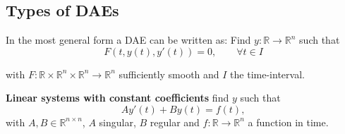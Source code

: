 	\subsection{Types of DAEs}
	\begin{frame}
		\vfill
		In the most general form a DAE can be written as:
		Find $y:\mathbb{R} \to \mathbb{R}^n$ such that
		\begin{equation}
			\label{Abstract_DAE}
			F(t, y(t), y'(t)) = 0, \qquad \forall t \in I
		\end{equation}
		
		with $F:\mathbb{R} \times \mathbb{R}^n \times \mathbb{R}^n \to \mathbb{R}^n$ sufficiently smooth and $I$ the time-interval.
		
		\textbf{Linear systems with constant coefficients} \newline
		find $y$ such that
		\begin{equation}
			\label{DAE-const-coeff}
			A y'(t) + B y(t) = f(t) ,
		\end{equation}
		with $A,B \in \mathbb{R}^{n \times n}$, $A$ singular, $B$ regular and $f:\mathbb{R} \to \mathbb{R}^n$ a function in time.
		\vfill
	\end{frame}
	
%			
%			

